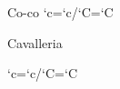 \startTEXpage
    \startexceptions
    Co-co
    \stopexceptions
    \hbox{\number`c=\the\hjcode`c/\number`C=\the\hjcode`C}\par
     Cavalleria\par
    \hbox{\number`c=\the\hjcode`c/\number`C=\the\hjcode`C}\par
\stopTEXpage

